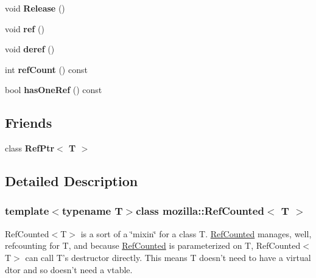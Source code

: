 \begin{DoxyCompactItemize}
\item 
\hypertarget{classmozilla_1_1_ref_counted_a72161179fb2466d80a8d927937a657be}{void {\bfseries Release} ()}\label{classmozilla_1_1_ref_counted_a72161179fb2466d80a8d927937a657be}

\item 
\hypertarget{classmozilla_1_1_ref_counted_a623ce25a4229da8434f7bd0e174fae8a}{void {\bfseries ref} ()}\label{classmozilla_1_1_ref_counted_a623ce25a4229da8434f7bd0e174fae8a}

\item 
\hypertarget{classmozilla_1_1_ref_counted_a57886d761389c3bda9285152e5c4954f}{void {\bfseries deref} ()}\label{classmozilla_1_1_ref_counted_a57886d761389c3bda9285152e5c4954f}

\item 
\hypertarget{classmozilla_1_1_ref_counted_a13c4f80e6b52b258a881f80e0f1c00a8}{int {\bfseries ref\-Count} () const }\label{classmozilla_1_1_ref_counted_a13c4f80e6b52b258a881f80e0f1c00a8}

\item 
\hypertarget{classmozilla_1_1_ref_counted_a799f1672c12deca68abb32b75c7f7793}{bool {\bfseries has\-One\-Ref} () const }\label{classmozilla_1_1_ref_counted_a799f1672c12deca68abb32b75c7f7793}

\end{DoxyCompactItemize}
\subsection*{Friends}
\begin{DoxyCompactItemize}
\item 
\hypertarget{classmozilla_1_1_ref_counted_a8e460ca80d19e4ea35d5957bf064c592}{class {\bfseries Ref\-Ptr$<$ T $>$}}\label{classmozilla_1_1_ref_counted_a8e460ca80d19e4ea35d5957bf064c592}

\end{DoxyCompactItemize}


\subsection{Detailed Description}
\subsubsection*{template$<$typename T$>$class mozilla\-::\-Ref\-Counted$<$ T $>$}

Ref\-Counted$<$\-T$>$ is a sort of a \char`\"{}mixin\char`\"{} for a class T. \hyperlink{classmozilla_1_1_ref_counted}{Ref\-Counted} manages, well, refcounting for T, and because \hyperlink{classmozilla_1_1_ref_counted}{Ref\-Counted} is parameterized on T, Ref\-Counted$<$\-T$>$ can call T's destructor directly. This means T doesn't need to have a virtual dtor and so doesn't need a vtable.

